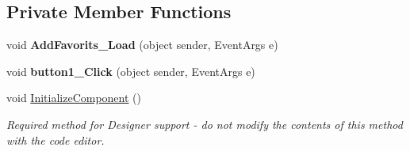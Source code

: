 \subsection*{Private Member Functions}
\begin{DoxyCompactItemize}
\item 
\mbox{\label{class_windows_forms_app2_1_1_ulubione_a14da54462628e6ed6e83b751d2c29eea}} 
void {\bfseries Add\+Favorits\+\_\+\+Load} (object sender, Event\+Args e)
\item 
\mbox{\label{class_windows_forms_app2_1_1_ulubione_a5a6ff5b746877a57b0dd0915068e8932}} 
void {\bfseries button1\+\_\+\+Click} (object sender, Event\+Args e)
\item 
void \hyperlink{class_windows_forms_app2_1_1_ulubione_a3f4798b6ad5b38e969020d292d104e55}{Initialize\+Component} ()
\begin{DoxyCompactList}\small\item\em Required method for Designer support -\/ do not modify the contents of this method with the code editor. \end{DoxyCompactList}\end{DoxyCompactItemize}
